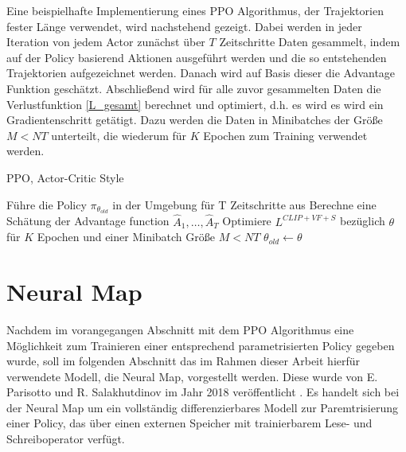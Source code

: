 Eine beispielhafte Implementierung eines PPO Algorithmus, der Trajektorien fester Länge verwendet, wird nachstehend gezeigt. Dabei werden in jeder Iteration von jedem Actor zunächst über $T$ Zeitschritte Daten gesammelt, indem auf der Policy basierend Aktionen ausgeführt werden und die so entstehenden Trajektorien aufgezeichnet werden. Danach wird auf Basis dieser die Advantage Funktion geschätzt. Abschließend wird für alle zuvor gesammelten Daten die Verlustfunktion \eqref{L_gesamt} berechnet und optimiert, d.h. es wird es wird ein Gradientenschritt getätigt. Dazu werden die Daten in Minibatches der Größe $M<NT$ unterteilt, die wiederum für $K$ Epochen zum Training verwendet werden.

\begin{algorithm}
	\caption{\ac{PPO}, Actor-Critic Style}
	\begin{algorithmic}
        \State Führe die Policy $\pi_{\theta_{old}}$ in der Umgebung für T Zeitschritte aus
				\State Berechne eine Schätung der Advantage function $\hat{A}_1,\dots,\hat{A}_T$
			\EndFor
			\State Optimiere $L^{CLIP+VF+S}$ bezüglich $\theta$ für $K$ Epochen und einer Minibatch Größe $M<NT$
			\State $\theta_{old} \gets \theta$
		\EndFor
	\end{algorithmic}
\end{algorithm}


\section{Neural Map}
\label{sec_neural_map}

Nachdem im vorangegangen Abschnitt mit dem PPO Algorithmus eine Möglichkeit zum Trainieren einer entsprechend parametrisierten Policy gegeben wurde, soll im folgenden Abschnitt das im Rahmen dieser Arbeit hierfür verwendete Modell, die Neural Map, vorgestellt werden. Diese wurde von E. Parisotto und R. Salakhutdinov im Jahr 2018 veröffentlicht \cite{NeuralMap}. Es handelt sich bei der Neural Map um ein vollständig differenzierbares Modell zur Paremtrisierung einer Policy, das über einen externen Speicher mit trainierbarem Lese- und Schreiboperator verfügt.

